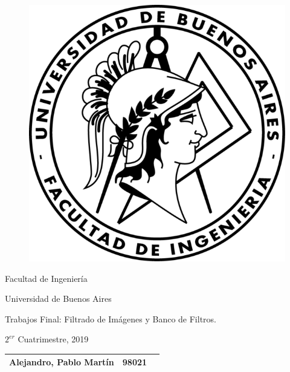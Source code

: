 \vspace*{0.10in}


\begin{figure}[htp]
				\begin{center}
					\includegraphics{imagenes/fiuba.png} 
				\end{center}
			\end{figure} 
            
\begin{center}
	\Huge{Facultad de Ingeniería}\\
    		\vspace{1.5mm}

	\Huge{Universidad de Buenos Aires}
    
    		\vspace{1.5mm}

    
    \huge{Trabajos Final: Filtrado de Imágenes y Banco de Filtros.}
	
		\vspace{3mm}


\vspace{3mm}


\vspace{3mm}

\Large $2^{er}$ Cuatrimestre, 2019 \\
\vspace{3mm}

\begin{tabular}{l c r}
\hline
\hline
\large{Alejandro, Pablo Martín} & \hspace{10mm}98021 & \hspace{10mm}{pabloale96@gmail.com} \\
\hline
\hline
\end{tabular}


\end{center}